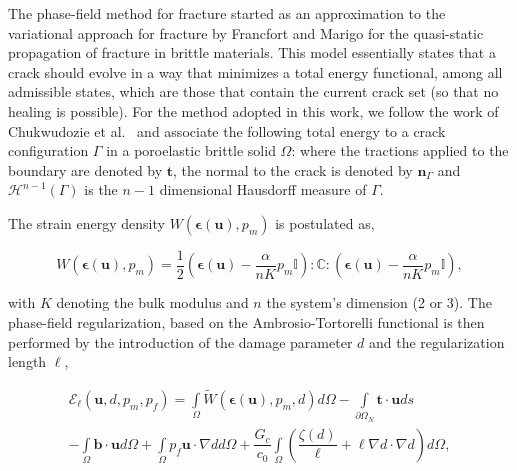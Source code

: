 The phase-field method for fracture started as an approximation \cite{bourdin2000numerical} to the variational approach for fracture by Francfort and Marigo \cite{francfort1998revisiting} for the quasi-static propagation of fracture in brittle materials. This model essentially states that a crack should evolve in a way that minimizes a total energy functional, among all admissible states, which are those that contain the current crack set (so that no healing is possible). For the method adopted in this work, we follow the work of Chukwudozie et al.\ \cite{chukwudozie2019variational} and associate the following total energy to a crack configuration $\Gamma$ in a poroelastic brittle solid $\Omega$:
where the tractions applied to the boundary are denoted by $\textbf{t}$, the normal to the crack is denoted by $\textbf{n}_{\Gamma}$ and $\mathcal{H}^{n-1}(\Gamma)$ is the $n-1$ dimensional Hausdorff measure of $\Gamma$. 

The strain energy density $W(\boldsymbol{\epsilon}(\textbf{u}), p_m)$ is postulated as,

\begin{equation}
    W(\boldsymbol{\epsilon}(\textbf{u}), p_m) = \dfrac{1}{2}\left( \boldsymbol\epsilon(\textbf{u}) - \dfrac{\alpha}{nK} p_m\mathbb{I}\right) : \mathbb{C} : \left( \boldsymbol\epsilon(\textbf{u}) - \dfrac{\alpha}{nK} p_m\mathbb{I}\right),
\end{equation}

with $K$ denoting the bulk modulus and $n$ the system's dimension (2 or 3). The phase-field regularization, based on the Ambrosio-Tortorelli \cite{ambrosio1990approximation} functional is then performed by the introduction of the damage parameter $d$ and the regularization length $\ell$,

\begin{multline}\label{Poroelastic PF funcional}
    \mathcal{E}_{\ell}(\textbf{u},d,p_m,p_f) = \int\limits_{\Omega }\widetilde{W}(\boldsymbol{\epsilon}(\textbf{u}), p_m, d)d\Omega - \int\limits_{\partial\Omega_N}\textbf{t} \cdot \textbf{u} ds \\
    - \int\limits_{\Omega} \textbf{b} \cdot \textbf{u} d\Omega
    + \int\limits_{\Omega}p_f \textbf{u} \cdot \nabla d d\Omega 
    + \dfrac{G_c}{c_0}\int\limits_{\Omega }\left(\dfrac{\zeta(d)}{\ell} + \ell\nabla d\cdot\nabla d  \right)d\Omega,
\end{multline}

